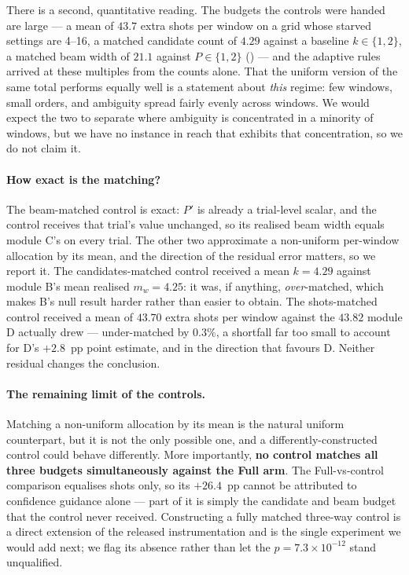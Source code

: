 There is a second, quantitative reading. The budgets the controls were
handed are large --- a mean of $43.7$ extra shots per window on a grid
whose starved settings are 4--16, a matched candidate count of $4.29$
against a baseline $k\in\{1,2\}$, a matched beam width of $21.1$ against
$P\in\{1,2\}$ (\SItables{}) --- and the adaptive rules arrived at these
multiples from the counts alone. That the uniform version of the same
total performs equally well is a statement about \emph{this} regime: few
windows, small orders, and ambiguity spread fairly evenly across windows.
We would expect the two to separate where ambiguity is concentrated in a
minority of windows, but we have no instance in reach that exhibits that
concentration, so we do not claim it.

\paragraph{How exact is the matching?} The beam-matched control is
exact: $P'$ is already a trial-level scalar, and the control receives
that trial's value unchanged, so its realised beam width equals module
C's on every trial. The other two approximate a non-uniform per-window
allocation by its mean, and the direction of the residual error matters,
so we report it. The candidates-matched control received a mean
$k=4.29$ against module B's mean realised $m_w=4.25$: it was, if
anything, \emph{over}-matched, which makes B's null result harder rather
than easier to obtain. The shots-matched control received a mean of
$43.70$ extra shots per window against the $43.82$ module D actually
drew --- under-matched by $0.3\%$, a shortfall far too small to account
for D's $+2.8$~pp point estimate, and in the direction that favours D.
Neither residual changes the conclusion.

\paragraph{The remaining limit of the controls.} Matching a non-uniform
allocation by its mean is the natural uniform counterpart, but it is not
the only possible one, and a differently-constructed control could
behave differently. More importantly, \textbf{no control matches all
three budgets simultaneously against the Full arm}. The
Full-vs-control comparison equalises shots only, so its $+26.4$~pp
cannot be attributed to confidence guidance alone --- part of it is
simply the candidate and beam budget that the control never received.
Constructing a fully matched three-way control is a direct extension of
the released instrumentation and is the single experiment we would add
next; we flag its absence rather than let the $p=7.3\times10^{-12}$
stand unqualified.

